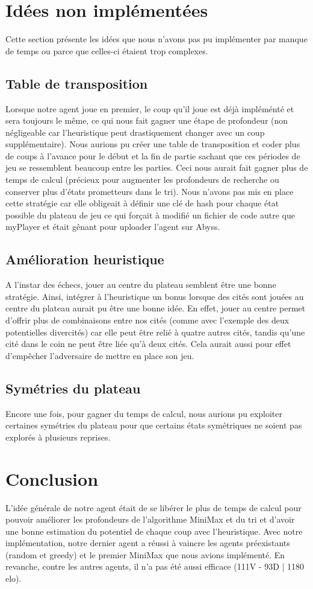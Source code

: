\documentclass[a4paper,11pt,titlepage,leqno]{article}
\begin{document}
\section{Idées non implémentées}
Cette section présente les idées que nous n'avons pas pu implémenter par manque de temps ou parce que celles-ci étaient trop complexes.

\subsection{Table de transposition}
Lorsque notre agent joue en premier, le coup qu'il joue est déjà impléménté et sera toujours le même, ce qui nous fait gagner une étape de profondeur (non négligeable car l'heuristique peut drastiquement changer avec un coup supplémentaire). Nous aurions pu créer une table de transposition et coder plus de coups à l'avance pour le début et la fin de partie sachant que ces périodes de jeu se ressemblent beaucoup entre les parties. Ceci nous aurait fait gagner plus de temps de calcul (précieux pour augmenter les profondeurs de recherche ou conserver plus d'états prometteurs dans le tri). Nous n'avons pas mis en place cette stratégie car elle obligeait à définir une clé de hash pour chaque état possible du plateau de jeu ce qui forçait à modifié un fichier de code autre que myPlayer et était gênant pour uploader l'agent sur Abyss.

\subsection{Amélioration heuristique}
A l'instar des échecs, jouer au centre du plateau semblent être une bonne stratégie. Ainsi, intégrer à l'heuristique un bonus lorsque des cités sont jouées au centre du plateau aurait pu être une bonne idée. En effet, jouer au centre permet d'offrir plus de combinaisons entre nos cités (comme avec l'exemple des deux potentielles divercités) car elle peut être relié à quatre autres cités, tandis qu'une cité dans le coin ne peut être liée qu'à deux cités. Cela aurait aussi pour effet d'empêcher l'adversaire de mettre en place son jeu.

\subsection{Symétries du plateau}
Encore une fois, pour gagner du temps de calcul, nous aurions pu exploiter certaines symétries du plateau pour que certains états symétriques ne soient pas explorés à plusieurs reprises.


\section*{Conclusion}

L'idée générale de notre agent était de se libérer le plus de temps de calcul pour pouvoir améliorer les profondeurs de l'algorithme MiniMax et du tri et d'avoir une bonne estimation du potentiel de chaque coup avec l'heuristique. Avec notre implémentation, notre dernier agent a réussi à vaincre les agents préexistants (random et greedy) et le premier MiniMax que nous avions implémenté. En revanche, contre les autres agents, il n'a pas été aussi efficace (111V - 93D | 1180 elo).
\end{document}
